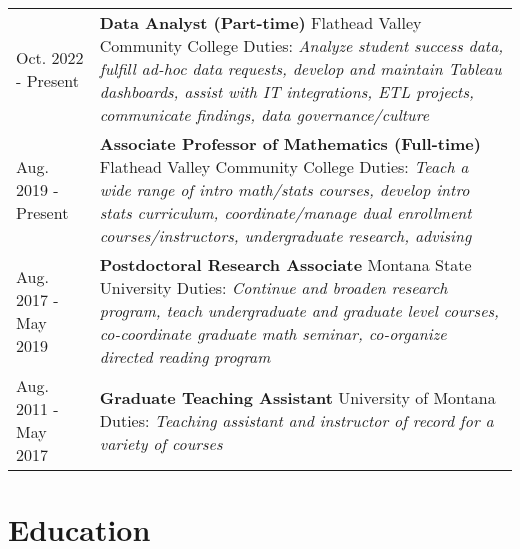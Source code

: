 \documentclass[12pt]{article}
\begin{document}
\begin{tabular}{ l p{15in} }
    Oct. 2022 - Present & \textbf{Data Analyst (Part-time)} \newline 
    Flathead Valley Community College
    \newline Duties: \textit{Analyze student success data, fulfill ad-hoc data requests,
    				\newline  develop and maintain Tableau dashboards, assist with IT integrations,
				\newline ETL projects, communicate findings, data governance/culture} \\ 

    Aug. 2019 - Present & \textbf{Associate Professor of Mathematics (Full-time)} \newline 
    Flathead Valley Community College
    \newline Duties: \textit{Teach a wide range of intro math/stats courses, 
    				   develop \newline  intro stats curriculum, coordinate/manage dual 
    				     enrollment  \newline courses/instructors, undergraduate research, advising} \\ 
    
    Aug. 2017 - May 2019 & \textbf{Postdoctoral Research Associate} \newline 
    Montana State University
    \newline Duties: \textit{Continue and broaden research program, teach
    					undergraduate \newline  and graduate level courses, co-coordinate graduate math seminar,
					\newline co-organize directed reading program} \\
    
    Aug. 2011 - May 2017 & \textbf{Graduate Teaching Assistant} \newline 
    University of Montana
    \newline Duties: \textit{Teaching assistant and instructor of record for a variety of courses} \\ 
\end{tabular}

\section{Education}
\end{document}
